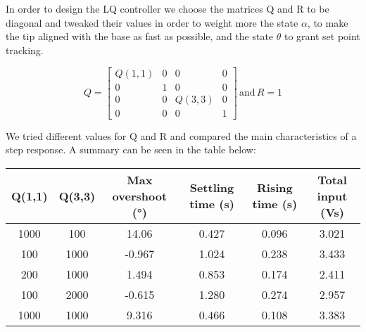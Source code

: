                     In order to design the LQ controller we choose the matrices Q and R to be diagonal and tweaked their values in order to weight more the state $\alpha$, to make the tip aligned with the base as fast as possible, and the state $\theta$ to grant set point tracking.

                    \begin{equation*}
                    Q = 
                        \begin{bmatrix}
                        Q(1,1) & 0 & 0 & 0 \\
                        0 & 1 & 0 & 0 \\
                        0 & 0 & Q(3,3) & 0 \\
                        0 & 0 & 0 & 1 
                    \end{bmatrix} \,
                    \text{and} \, R = 1
                    \end{equation*} 

                    We tried different values for Q and R and compared the main characteristics of a step response.
                    A summary can be seen in the table below:

                    \begin{table}[h!]
                        \centering
                        \hspace*{-3em}
                        \begin{tabular}{||c c c c c c||} 
                        \hline
                        Q(1,1)  & Q(3,3) & Max overshoot (°) & Settling time (s)& Rising time (s) & Total input (Vs)\\ 
                        \hline\hline
                        1000 & 100 & 14.06 & 0.427 & 0.096 & 3.021 \\ 
                        \hline
                        100 & 1000 & -0.967 & 1.024 & 0.238 & 3.433 \\
                        \hline
                        200 & 1000 & 1.494 & 0.853 & 0.174 & 2.411 \\
                        \hline
                        100 & 2000 & -0.615 & 1.280 & 0.274 & 2.957 \\
                        \hline
                        1000 & 1000 & 9.316 & 0.466 & 0.108 & 3.383 \\ [1ex] 
                        \hline
                        \end{tabular}
                    \end{table}

